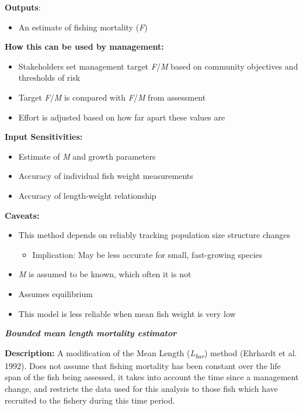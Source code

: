 \documentclass[]{book}
\providecommand{\tightlist}{%
  \setlength{\itemsep}{0pt}\setlength{\parskip}{0pt}}
\begin{document}
\textbf{Outputs}:

\begin{itemize}
\tightlist
\item
  An estimate of fishing mortality (\emph{F})
\end{itemize}

\textbf{How this can be used by management: }

\begin{itemize}
\item
  Stakeholders set management target \emph{F}/\emph{M} based on
  community objectives and thresholds of risk
\item
  Target \emph{F}/\emph{M} is compared with \emph{F}/\emph{M} from
  assessment
\item
  Effort is adjusted based on how far apart these values are
\end{itemize}

\textbf{Input Sensitivities: }

\begin{itemize}
\item
  Estimate of \emph{M} and growth parameters
\item
  Accuracy of individual fish weight measurements
\item
  Accuracy of length-weight relationship
\end{itemize}

\textbf{Caveats: }

\begin{itemize}
\item
  This method depends on reliably tracking population size structure
  changes

  \begin{itemize}
  \tightlist
  \item
    Implication: May be less accurate for small, fast-growing species
  \end{itemize}
\item
  \emph{M} is assumed to be known, which often it is not
\item
  Assumes equilibrium
\item
  This model is less reliable when mean fish weight is very low
\end{itemize}

\textbf{\emph{Bounded mean length mortality estimator}}

\textbf{Description:} A modification of the Mean Length
(\emph{L\textsubscript{bar}}) method (Ehrhardt et al. 1992). Does not
assume that fishing mortality has been constant over the life span of
the fish being assessed, it takes into account the time since a
management change, and restricts the data used for this analysis to
those fish which have recruited to the fishery during this time period.
\end{document}
